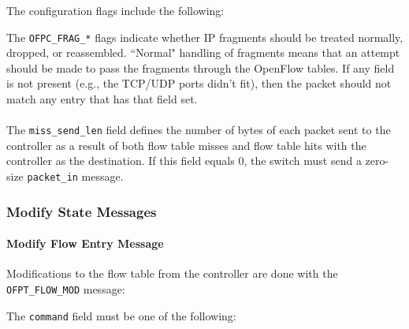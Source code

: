 
The configuration flags include the following:


The \verb|OFPC_FRAG_*| flags indicate whether IP fragments should be treated normally, dropped, or reassembled.  ``Normal" handling of fragments means that an attempt should be made to pass the fragments through the OpenFlow tables. If any field is not present (e.g., the TCP/UDP ports didn't fit), then the packet should not match any entry that has that field set.
\\\\
The \verb|miss_send_len| field defines the number of bytes of each packet sent to the controller as a result of both flow table misses and flow table hits with the controller as the destination.  If this field equals 0, the switch must send a zero-size \verb|packet_in| message.

\subsubsection{Modify State Messages}
\paragraph{Modify Flow Entry Message}
Modifications to the flow table from the controller are done with the \verb|OFPT_FLOW_MOD| message:


The \verb|command| field must be one of the following:

